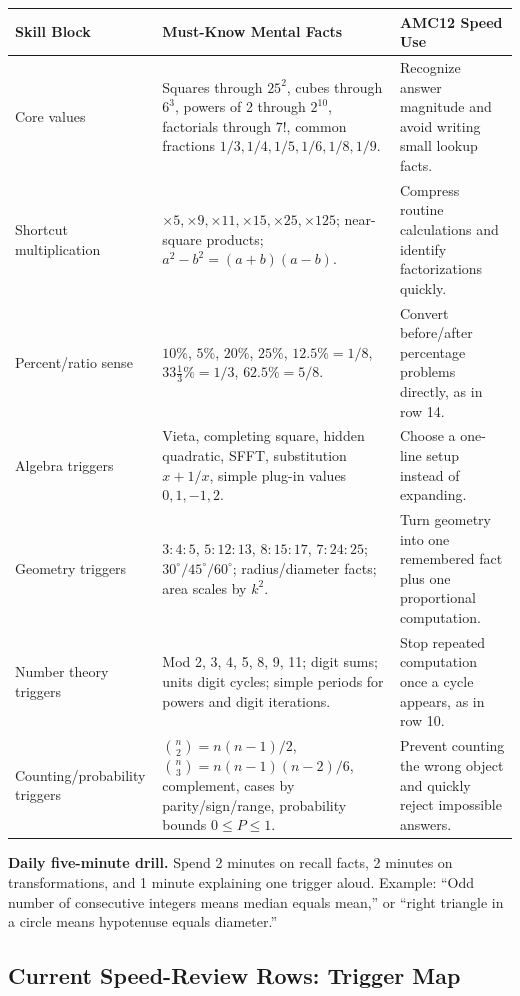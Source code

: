 \documentclass[11pt]{article}
\begin{document}
\begin{longtable}{@{}>{\raggedright\arraybackslash}p{} >{\raggedright\arraybackslash}p{} >{\raggedright\arraybackslash}p{}@{}}
\textbf{Skill Block} & \textbf{Must-Know Mental Facts} & \textbf{AMC12 Speed Use}\\
\hline
Core values & Squares through \(25^2\), cubes through \(6^3\), powers of 2 through \(2^{10}\), factorials through \(7!\), common fractions \(1/3,1/4,1/5,1/6,1/8,1/9\). & Recognize answer magnitude and avoid writing small lookup facts.\\
Shortcut multiplication & \(\times 5,\times 9,\times 11,\times 15,\times 25,\times 125\); near-square products; \(a^2-b^2=(a+b)(a-b)\). & Compress routine calculations and identify factorizations quickly.\\
Percent/ratio sense & \(10\%\), \(5\%\), \(20\%\), \(25\%\), \(12.5\%=1/8\), \(33\frac{1}{3}\%=1/3\), \(62.5\%=5/8\). & Convert before/after percentage problems directly, as in row 14.\\
Algebra triggers & Vieta, completing square, hidden quadratic, SFFT, substitution \(x+1/x\), simple plug-in values \(0,1,-1,2\). & Choose a one-line setup instead of expanding.\\
Geometry triggers & \(3\!:\!4\!:\!5\), \(5\!:\!12\!:\!13\), \(8\!:\!15\!:\!17\), \(7\!:\!24\!:\!25\); \(30^\circ/45^\circ/60^\circ\); radius/diameter facts; area scales by \(k^2\). & Turn geometry into one remembered fact plus one proportional computation.\\
Number theory triggers & Mod 2, 3, 4, 5, 8, 9, 11; digit sums; units digit cycles; simple periods for powers and digit iterations. & Stop repeated computation once a cycle appears, as in row 10.\\
Counting/probability triggers & \(\binom{n}{2}=n(n-1)/2\), \(\binom{n}{3}=n(n-1)(n-2)/6\), complement, cases by parity/sign/range, probability bounds \(0\le P\le1\). & Prevent counting the wrong object and quickly reject impossible answers.\\
\end{longtable}

\textbf{Daily five-minute drill.} Spend 2 minutes on recall facts, 2 minutes on transformations, and 1 minute explaining one trigger aloud. Example: ``Odd number of consecutive integers means median equals mean,'' or ``right triangle in a circle means hypotenuse equals diameter.''

\subsection{Current Speed-Review Rows: Trigger Map}
\end{document}
